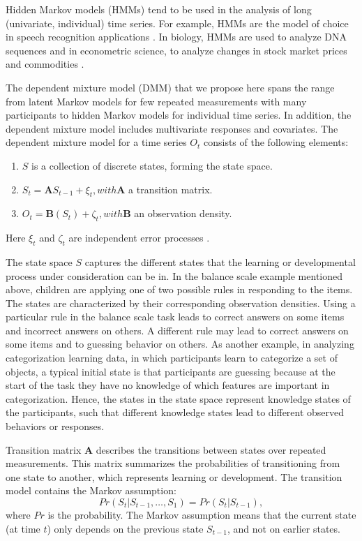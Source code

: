 \documentclass[a4paper,12pt,man]{apa} %
\newcommand{\mat}{\mathbf}
\begin{document}
Hidden Markov models (HMMs) tend to be used in the analysis of long
(univariate, individual) time series.  For example, HMMs are the model
of choice in speech recognition applications \cite{Rabiner1989}.  In
biology, HMMs are used to analyze DNA sequences \cite{Krogh1998} and
in econometric science, to analyze changes in stock market prices and
commodities \cite{Kim1994}.

The dependent mixture model (DMM) that we propose here spans the range
from latent Markov models for few repeated measurements with many
participants to hidden Markov models for individual time series.  In
addition, the dependent mixture model includes multivariate responses
and covariates.  The dependent mixture model for a time series $O_{t}$
consists of the following elements:
\begin{enumerate}
	\item $S$ is a collection of discrete states, forming the state space.
	\item $S_{t} = \mat{A}S_{t-1}+\xi_{t}, with \mat{A}$ a transition matrix.
	\item $O_{t} = \mat{B}(S_{t}) + \zeta_{t}, with \mat{B}$  an observation density.
\end{enumerate}
Here $\xi_{t}$ and $\zeta_{t}$ are independent error processes 
\cite{Elliott1995}. 

The state space $S$ captures the different states that the learning or
developmental process under consideration can be in.  In the balance
scale example mentioned above, children are applying one of two
possible rules in responding to the items.  The states are
characterized by their corresponding observation densities.  Using a
particular rule in the balance scale task leads to correct answers on
some items and incorrect answers on others.  A different rule may lead
to correct answers on some items and to guessing behavior on others.
As another example, in analyzing categorization learning data, in
which participants learn to categorize a set of objects, a typical
initial state is that participants are guessing because at the start
of the task they have no knowledge of which features are important in
categorization.  Hence, the states in the state space represent
knowledge states of the participants, such that different knowledge
states lead to different observed behaviors or responses.

Transition matrix $\mat{A}$ describes the transitions between states
over repeated measurements.  This matrix summarizes the probabilities
of transitioning from one state to another, which represents learning
or development.  The transition model contains the Markov assumption:
$$Pr(S_{t}|S_{t-1}, \ldots, S_{1}) = Pr(S_{t}|S_{t-1}),$$
where $Pr$ is the probability.  The Markov assumption means that the
current state (at time $t$) only depends on the previous state
$S_{t-1}$, and not on earlier states. 
\end{document}
